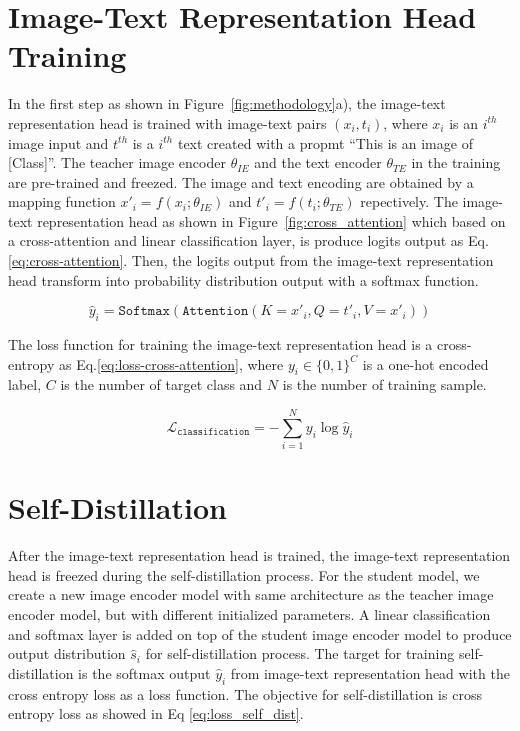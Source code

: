 \section{Image-Text Representation Head Training}
In the first step as shown in Figure~\ref{fig:methodology}a), the image-text representation head is trained with image-text pairs $(x_i, t_i)$, where $x_i$ is an $i^{th}$ image input and $t^{th}$ is a $i^{th}$ text created with a propmt ``This is an image of [Class]''.
The teacher image encoder $\theta_{IE}$ and the text encoder $\theta_{TE}$ in the training are pre-trained and freezed.
The image and text encoding are obtained by a mapping function $x'_i = f(x_i; \theta_{IE})$ and $t'_i = f(t_i; \theta_{TE})$ repectively.
The image-text representation head as shown in Figure~\ref{fig:cross_attention} which based on a cross-attention and linear classification layer, is produce logits output as Eq.\ref{eq:cross-attention}.
Then, the logits output from the image-text representation head transform into probability distribution output with a softmax function.

\begin{equation}
    \label{eq:cross-attention}
    \hat{y}_i = \texttt{Softmax}(\texttt{Attention}(K=x'_i, Q=t'_i, V=x'_i))
\end{equation}

The loss function for training the image-text representation head is a cross-entropy as Eq.\ref{eq:loss-cross-attention}, where $y_i\in\{ 0,1 \}^{C}$ is a one-hot encoded label, $C$ is the number of target class and $N$ is the number of training sample.

\begin{equation}
    \label{eq:loss-cross-attention}
    \mathcal{L}_{\texttt{classification}} = -\sum_{i=1}^{N} y_i\log\hat{y}_i
\end{equation}

\section{Self-Distillation}
After the image-text representation head is trained, the image-text representation head is freezed during the self-distillation process.
For the student model, we create a new image encoder model with same architecture as the teacher image encoder model, but with different initialized parameters.
A linear classification and softmax layer is added on top of the student image encoder model to produce output distribution $\hat{s}_i$ for self-distillation process.
The target for training self-distillation is the softmax output $\hat{y}_i$ from image-text representation head with the cross entropy loss as a loss function.
The objective for self-distillation is cross entropy loss as showed in Eq \ref{eq:loss_self_dist}.

